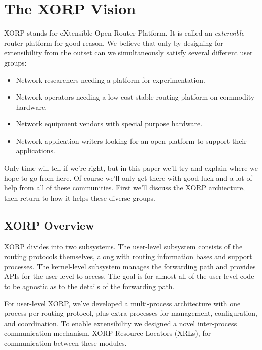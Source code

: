 \section{The XORP Vision}

XORP stands for eXtensible Open Router Platform.  It is called an {\it
extensible} router platform for good reason.  We believe that only by
designing for extensibility from the outset can we simultaneously
satisfy several different user groups:
\begin{itemize}
\vspace{-0.07in}
\item Network researchers needing a platform for experimentation.
\vspace{-0.07in}
\item Network operators needing a low-cost stable routing platform on
commodity hardware.
\vspace{-0.07in}
\item Network equipment vendors with special purpose hardware.
\vspace{-0.07in}
\item Network application writers looking for an open platform to
support their applications.
\end{itemize}
\vspace{-0.05in}
Only time will tell if we're right, but in this paper we'll try and
explain where we hope to go from here.  Of course we'll only get there
with good luck and a lot of help from all of these communities.  First
we'll discuss the XORP archiecture, then return to how it helps these
diverse groups.

\subsection{XORP Overview}

XORP divides into two subsystems. The user-level subsystem consists of the routing protocols themselves, along with routing
information bases and support processes. The kernel-level subsystem manages the forwarding path and provides APIs for the user-level to access. The goal is for almost all of the user-level code to be agnostic as to the details of the forwarding path.

For user-level XORP, we've developed a multi-process architecture with
one process per routing protocol, plus extra processes for management,
configuration, and coordination.  To enable extensibility we designed
a novel inter-process communication mechanism, XORP Resource
Locators (XRLs), for communication between these modules.  

